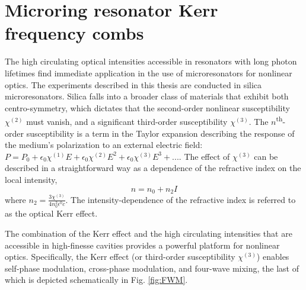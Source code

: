 







\section{Microring resonator Kerr frequency combs}

The high circulating optical intensities accessible in resonators with long photon lifetimes find immediate application in the use of microresonators for nonlinear optics. The experiments described in this thesis are conducted in silica microresonators. Silica falls into a broader class of materials that exhibit both centro-symmetry, which dictates that the second-order nonlinear susceptibility $\chi^{(2)}$ must vanish, and a significant third-order susceptibility $\chi^{(3)}$. The $n$\textsuperscript{th}-order susceptibility is a term in the Taylor expansion describing the response of the medium's polarization to an external electric field: $P=P_0+\epsilon_0 \chi^{(1)} E + \epsilon_0 \chi^{(2)} E^2 + \epsilon_0 \chi^{(3)} E^3+...$. The effect of $\chi^{(3)}$ can be described in a straightforward way as a dependence of the refractive index on the local intensity\cite{somethingelse},
\begin{equation}
n=n_0+n_2 I 
\end{equation}
where $n_2=\frac{3\chi^{(3)}}{4n_0^2\epsilon^0 c}$\cite{CosoAndSolis,alsoLLbook?}. The intensity-dependence of the refractive index is referred to as the optical Kerr effect.

The combination of the Kerr effect and the high circulating intensities that are accessible in high-finesse cavities provides a powerful platform for nonlinear optics. Specifically, the Kerr effect (or third-order susceptibility $\chi^{(3)}$) enables self-phase modulation, cross-phase modulation, and four-wave mixing, the last of which is depicted schematically in Fig. \ref{fig:FWM}. 

